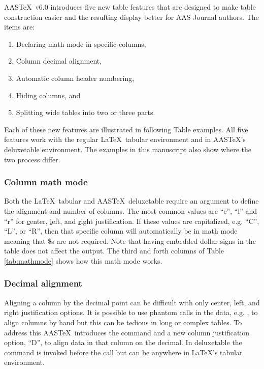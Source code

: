 \documentclass{aastex6}
\newcommand\aastex{AAS\TeX}
\newcommand\latex{La\TeX}
\begin{document}
\aastex\ v6.0 introduces five new table features that are designed to make
table construction easier and the resulting display better for AAS Journal
authors.  The items are:

\begin{enumerate}
\item Declaring math mode in specific columns,
\item Column decimal alignment,
\item Automatic column header numbering,
\item Hiding columns, and
\item Splitting wide tables into two or three parts.
\end{enumerate}

Each of these new features are illustrated in following Table examples.
All five features work with the regular \latex\ tabular environment and in
\aastex's deluxetable environment.  The examples in this manuscript also
show where the two process differ.

\subsubsection{Column math mode}

Both the \latex\ tabular and \aastex\ deluxetable require an argument to
define the alignment and number of columns.  The most common values are
``c'', ``l'' and ``r'' for \underline{c}enter, \underline{l}eft, and
\underline{r}ight justification.  If these values are capitalized, e.g.
``C'', ``L'', or ``R'', then that specific column will automatically be in math
mode meaning that \$s are not required.  Note that having embedded dollar
signs in the table does not affect the output.  The third and forth columns
of Table \ref{tab:mathmode} shows how this math mode works.

\subsubsection{Decimal alignment}

Aligning a column by the decimal point can be difficult with only center,
left, and right justification options.  It is possible to use phantom calls
in the data, e.g. {\tt\string\phn}, to align columns by hand but this can
be tedious in long or complex tables.  To address this \aastex\ introduces
the {\tt\string\decimals} command and a new column justification option,
``D'', to align data in that column on the decimal.  In deluxetable the
{\tt\string\decimals} command is invoked before the {\tt\string\startdata}
call but can be anywhere in \latex's tabular environment.
\end{document}
